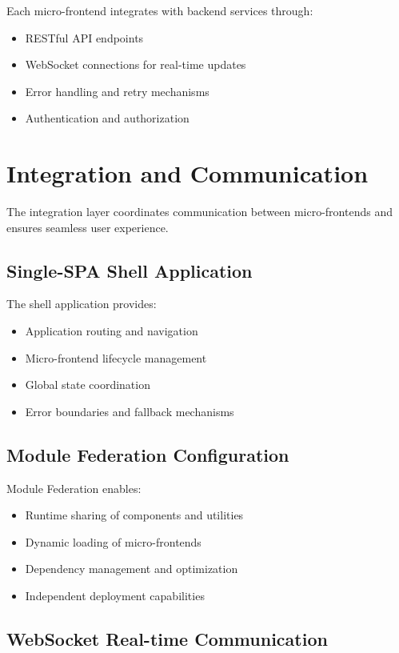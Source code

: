 \documentclass[12pt,a4paper]{report}
\begin{document}
Each micro-frontend integrates with backend services through:
\begin{itemize}
    \item RESTful API endpoints
    \item WebSocket connections for real-time updates
    \item Error handling and retry mechanisms
    \item Authentication and authorization
\end{itemize}

\section{Integration and Communication}

The integration layer coordinates communication between micro-frontends and ensures seamless user experience.

\subsection{Single-SPA Shell Application}

The shell application provides:
\begin{itemize}
    \item Application routing and navigation
    \item Micro-frontend lifecycle management
    \item Global state coordination
    \item Error boundaries and fallback mechanisms
\end{itemize}

\subsection{Module Federation Configuration}

Module Federation enables:
\begin{itemize}
    \item Runtime sharing of components and utilities
    \item Dynamic loading of micro-frontends
    \item Dependency management and optimization
    \item Independent deployment capabilities
\end{itemize}

\subsection{WebSocket Real-time Communication}
\end{document}
